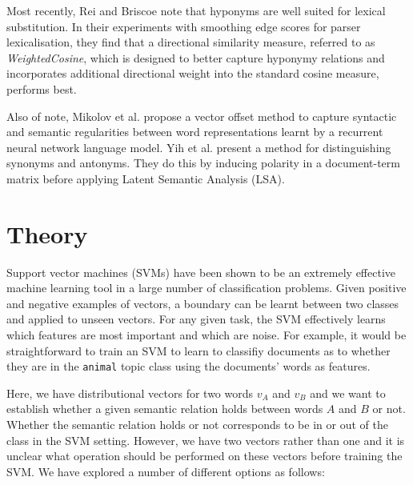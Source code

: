 \documentclass[11pt]{article}
\begin{document}
Most recently, Rei and Briscoe  note that hyponyms are well suited for lexical substitution.  In their experiments with smoothing edge scores for parser lexicalisation, they find that a directional similarity measure, referred to as \emph{WeightedCosine}, which is designed to better capture hyponymy relations and incorporates additional directional weight into the standard cosine measure, performs best.

Also of note, Mikolov et al.  propose a vector offset method to capture syntactic and semantic regularities between word representations learnt by a recurrent neural network language model.  Yih et al.  present a method for distinguishing synonyms and antonyms.  They do this by inducing polarity in a document-term matrix before applying Latent Semantic Analysis (LSA).

\section{Theory}
\label{sect:theory}
Support vector machines (SVMs) have been shown to be an extremely effective machine learning tool in a large number of classification problems.  Given positive and negative examples of vectors, a boundary can be learnt between two classes and applied to unseen vectors.  For any given task, the SVM effectively learns which features are most important and which are noise.  For example, it would be straightforward to train an SVM to learn to classifiy documents as to whether they are in the \texttt{animal} topic class using the documents' words as features.     

Here, we have distributional vectors for two words $v_A$ and $v_B$ and we want to establish whether a given semantic relation holds between words $A$ and $B$ or not.  Whether the semantic relation holds or not corresponds to be in or out of the class in the SVM setting.  However, we have two vectors rather than one and it is unclear what operation should be performed on these vectors before training the SVM.  We have explored a number of different options as follows:
\end{document}
